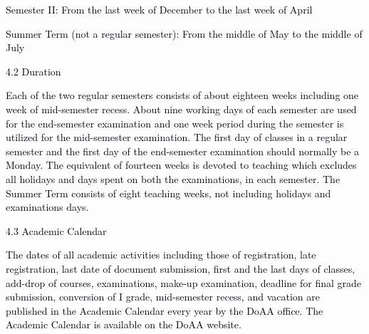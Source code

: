 \documentclass[12pt]{article}
\begin{document}
\vspace{\baselineskip}
{\fontsize{10pt}{12.0pt}\selectfont \textcolor[HTML]{00000A}{Semester II: From the last week of December to the last week of April}\par}\par


\vspace{\baselineskip}
{\fontsize{10pt}{12.0pt}\selectfont \textcolor[HTML]{00000A}{Summer Term (not a regular semester): From the middle of May to the middle of July}\par}\par


\vspace{\baselineskip}
\textcolor[HTML]{00000A}{4.2 Duration}\par


\vspace{\baselineskip}
\begin{justify}
{\fontsize{10pt}{12.0pt}\selectfont \textcolor[HTML]{00000A}{Each of the two regular semesters consists of about eighteen weeks including one week of mid-semester recess. About nine working days of each semester are used for the end-semester examination and one week period during the semester is utilized for the mid-semester examination. The first day of classes in a regular semester and the first day of the end-semester examination should normally be a Monday. The equivalent of fourteen weeks is devoted to teaching which excludes all holidays and days spent on both the examinations, in each semester. The Summer Term consists of eight teaching weeks, not including holidays and examinations days.}\par}
\end{justify}\par


\vspace{\baselineskip}
\textcolor[HTML]{00000A}{4.3 Academic Calendar}\par


\vspace{\baselineskip}
\begin{justify}
{\fontsize{10pt}{12.0pt}\selectfont \textcolor[HTML]{00000A}{The dates of all academic activities including those of registration, late registration, last date of document submission, first and the last days of classes, add-drop of courses, examinations, make-up examination, deadline for final grade submission, conversion of I grade, mid-semester recess, and vacation are published in the Academic Calendar every year by the DoAA office. The Academic Calendar is available on the DoAA website.}\par}
\end{justify}\par
\end{document}
